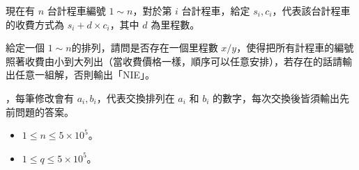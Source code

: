 \newcommand{\bigEmoji}[1]{\scalebox{2.5}{\twemoji{#1}}}
\newcommand{\mediumEmoji}[1]{\raisebox{-0.05em}{\scalebox{1.7}{\twemoji{#1}}}}
\begin{frame}{}
     {
        \begin{problem}
            現在有 $n$ 台計程車編號 $1\sim n$，對於第 $i$ 台計程車，給定 $s_i,c_i$，代表該台計程車的收費方式為 $s_i + d\times c_i$，其中 $d$ 為里程數。
    
            給定一個 $1\sim n$的排列，請問是否存在一個里程數 $x/y$，使得把所有計程車的編號照著收費由小到大列出（當收費價格一樣，順序可以任意安排），若存在的話請輸出任意一組解，否則輸出「NIE」。
    
             {
                ，每筆修改會有 $a_i,b_i$，代表交換排列在 $a_i$ 和 $b_i$ 的數字，每次交換後皆須輸出先前問題的答案。
            }
    
            \begin{itemize}
                \item $1\le n\le 5\times10^5$。
                \item $1\le q\le 5\times10^5$。
            \end{itemize}
        \end{problem}
    }


\end{frame}
